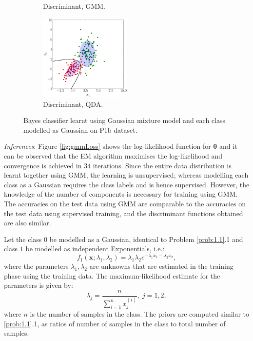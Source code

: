 \documentclass[11pt, a4 paper]{article}
\newcommand{\bx}{\mathbf{x}}
\newcommand{\btheta}{\boldsymbol{\theta}}
\begin{document}
\begin{figure}[!htbp]
\begin{subfigure}[!htbp]{0.24\textwidth}
       \caption{Discriminant, GMM.}
       \label{fig:GMM_DF_P1b}
    \end{subfigure}
\quad
    \begin{subfigure}[!htbp]{0.24\textwidth}
       \centering
       \includegraphics[width=1.8in]{../results/ex1/samples_QD_ML_dataset_P1b_size_199.pdf}
       \caption{Discriminant, QDA.}
       \label{fig:QDA_DF_P1b}
    \end{subfigure}
\caption{Bayes classifier learnt using Gaussian mixture model and each class modelled as Gaussian on P1b dataset.}
\label{fig:ex12P1b}
\end{figure}
{\it Inferences}: Figure \ref{fig:gmmLoss} shows the log-likelihood function for $\btheta$ and it can be observed that the EM algorithm maximises the log-likelihood and convergence is achieved in $34$ iterations. Since the entire data distribution is learnt together using GMM, the learning is unsupervised; whereas modelling each class as a Gaussian requires the class labels and is hence supervised. However, the knowledge of the number of components is necessary for training using GMM. The accuracies on the test data using GMM are comparable to the accuracies on the test data using supervised training, and the discriminant functions obtained are also similar.


\label{prob:1.3}
Let the class $0$ be modelled as a Gaussian, identical to Problem \ref{prob:1.1}.1 and class $1$ be modelled as independent Exponentials, i.e.:
\begin{equation}
	f_{1}(\bx; \lambda_{1}, \lambda_{2}) = \lambda_{1}\lambda_{2} e^{-\lambda_{1}x_{1} -\lambda_{2}x_{2}},
\label{eq:expConditionalModel}
\end{equation}
where the parameters $\lambda_{1}, \lambda_{2}$ are unknowns that are estimated in the training phase using the training data. The maximum-likelihood estimate for the parameters is given by:
\begin{equation}
	\lambda_{j} = \frac{n}{\sum_{i=1}^{n} x_{j}^{(i)}}, \; j=1,2,
\label{eq:mleExp}
\end{equation}
where $n$ is the number of samples in the class. The priors are computed similar to \ref{prob:1.1}.1, as ratios of number of samples in the class to total number of samples.
\end{document}
